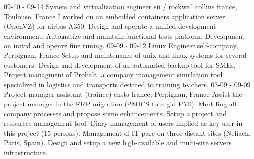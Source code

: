 \documentclass[]{friggeri-cv}
\begin{document}
\begin{entrylist}
{        }
    \entry
        {09-10 - 09-14}
        {System and virtualization engineer}
        {sii / rockwell collins france, Toulouse, France}
        {I worked on an embedded containers application server (OpenVZ) for airbus A350.
        Design and operate a unified development environment.
        Automatize and maintain functional tests platform.
        Development on initrd and openvz fine tuning.
        }
    \entry
        {09-09 - 09-12}
        {Linux Engineer}
        {self-company, Perpignan, France}
        {Setup and maintenance of unix and linux systems for several customers.
        Design and development of an automated backup tool for SMEs.
        Project managment of Probalt, a company management simulation tool specialized in 
        logistics and transports destined to training teachers.
        }
    \entry
        {03-09 - 09-09}
        {Project manager assistant (trainee)}
        {ensto france, Perpignan, France}
        {Assist the project manager in the ERP migration (PMICS to cegid PMI).
        Modeling all company processes and propose some enhancements.
        Setup a project and resources management tool.
        Diary management of users implied as key user in this project (15 persons).
        Management of IT parc on three distant sites (Nefiach, Paris, Spain).
        Design and setup a new high-available and multi-site servers infrastructure.
        }
\end{entrylist}
\end{document}
